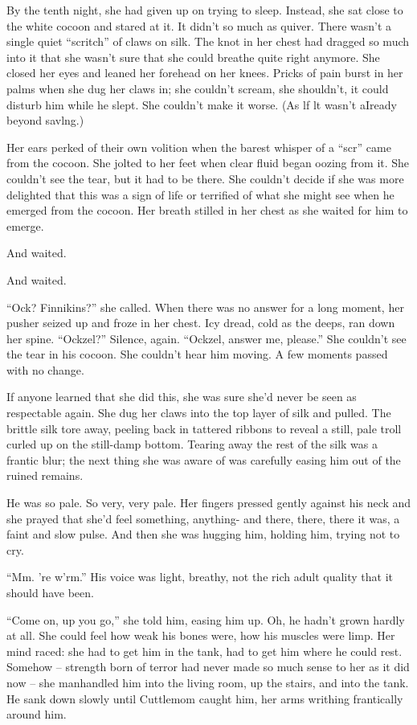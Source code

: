 \documentclass[a1paper]{article}
\begin{document}
\begin{multicols}{7}
{By the tenth night, she had given up on trying to sleep.  Instead, she sat close to the white cocoon and stared at it.  It didn't so much as quiver.  There wasn't a single quiet “scritch” of claws on silk.  The knot in her chest had dragged so much into it that she wasn't sure that she could breathe quite right anymore.  She closed her eyes and leaned her forehead on her knees.  Pricks of pain burst in her palms when she dug her claws in; she couldn't scream, she shouldn't, it could disturb him while he slept.  She couldn't make it worse.  (As lf lt wasn't aIready beyond savlng.)

Her ears perked of their own volition when the barest whisper of a “scr” came from the cocoon.  She jolted to her feet when clear fluid began oozing from it.  She couldn't see the tear, but it had to be there.  She couldn't decide if she was more delighted that this was a sign of life or terrified of what she might see when he emerged from the cocoon.  Her breath stilled in her chest as she waited for him to emerge.

And waited.

And waited.

“Ock?  Finnikins?” she called.  When there was no answer for a long moment, her pusher seized up and froze in her chest.  Icy dread, cold as the deeps, ran down her spine.  “Ockzel?”  Silence, again.  “Ockzel, answer me, please.”  She couldn't see the tear in his cocoon.  She couldn't hear him moving.  A few moments passed with no change.

If anyone learned that she did this, she was sure she'd never be seen as respectable again.  She dug her claws into the top layer of silk and pulled.  The brittle silk tore away, peeling back in tattered ribbons to reveal a still, pale troll curled up on the still-damp bottom.  Tearing away the rest of the silk was a frantic blur; the next thing she was aware of was carefully easing him out of the ruined remains.

He was so pale.  So very, very pale.  Her fingers pressed gently against his neck and she prayed that she'd feel something, anything- and there, there, there it was, a faint and slow pulse.  And then she was hugging him, holding him, trying not to cry.

“Mm.  're w'rm.”  His voice was light, breathy, not the rich adult quality that it should have been.

“Come on, up you go,” she told him, easing him up.  Oh, he hadn't grown hardly at all.  She could feel how weak his bones were, how his muscles were limp.  Her mind raced:  she had to get him in the tank, had to get him where he could rest.  Somehow – strength born of terror had never made so much sense to her as it did now – she manhandled him into the living room, up the stairs, and into the tank.  He sank down slowly until Cuttlemom caught him, her arms writhing frantically around him.

}
\end{multicols}
\end{document}
